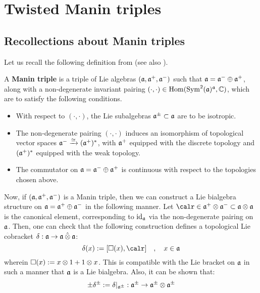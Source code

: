 \section{Twisted Manin triples}
    \subsection{Recollections about Manin triples}
        Let us recall the following definition from \cite[Subsection 2.6]{appel_laredo_2_categorical_etingof_kazhdan_quantisation} (see also \cite[Subsection 7.4]{etingof_kazhdan_quantisation_1}).
        \begin{definition} \label{def: manin_triples}
            A \textbf{Manin triple} is a triple of Lie algebras $(\mathfrak{a}, \mathfrak{a}^+, \mathfrak{a}^-)$ such that $\mathfrak{a} = \mathfrak{a}^- \oplus \mathfrak{a}^+$, along with a non-degenerate invariant pairing $(\cdot, \cdot) \in \operatorname{Hom}( \operatorname{Sym}^2(\mathfrak{a})^{\mathfrak{a}}, \mathbb{C} )$, which are to satisfy the following conditions.
            \begin{itemize}
                \item With respect to $(\cdot, \cdot)$, the Lie subalgebras $\mathfrak{a}^{\pm} \subset \mathfrak{a}$ are to be isotropic. 
                \item The non-degenerate pairing $(\cdot, \cdot)$ induces an isomorphism of topological vector spaces $\mathfrak{a}^- \xrightarrow[]{\simeq} (\mathfrak{a}^+)^*$, with $\mathfrak{a}^+$ equipped with the discrete topology and $(\mathfrak{a}^+)^*$ equipped with the weak topology.
                \item The commutator on $\mathfrak{a} = \mathfrak{a}^- \oplus \mathfrak{a}^+$ is continuous with respect to the topologies chosen above. 
            \end{itemize}
        \end{definition}
        Now, if $(\mathfrak{a}, \mathfrak{a}^+, \mathfrak{a}^-)$ is a Manin triple, then we can construct a Lie bialgebra structure on $\mathfrak{a} = \mathfrak{a}^+ \oplus \mathfrak{a}^-$ in the following manner. Let $\calr \in \a^+ \tensor \a^- \subset \a \tensor \a$ is the canonical element, corresponding to $\mathrm{id}_{\mathfrak{a}}$ via the non-degenerate pairing on $\mathfrak{a}$. Then, one can check that the following construction defines a topological Lie cobracket $\delta: \a \to \a \hattensor \a$:
            \begin{equation}
                \delta(x) := [\Box(x), \calr] \quad, \quad x \in \a
            \end{equation}
        wherein $\Box(x) := x \tensor 1 + 1 \tensor x$. This is compatible with the Lie bracket on $\mathfrak{a}$ in such a manner that $\mathfrak{a}$ is a Lie bialgebra. Also, it can be shown that:
            $$\pm \delta^{\pm} := \delta|_{\a^{\pm}}: \a^{\pm} \to \a^{\pm} \tensor \a^{\pm}$$
